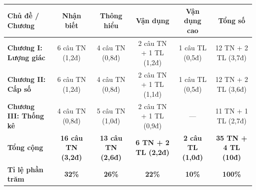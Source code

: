 \documentclass[12pt, a4paper]{article}
\begin{document}
\begin{center}
\begin{tabularx}{\linewidth}{|p{3.2cm}|c|c|c|c|c|}
\hline
\textbf{Chủ đề / Chương} & \textbf{Nhận biết} & \textbf{Thông hiểu} & \textbf{Vận dụng} & \textbf{Vận dụng cao} & \textbf{Tổng số} \\
\hline
\textbf{Chương I: Lượng giác} & 6 câu TN (1,2đ) & 4 câu TN (0,8đ) & 2 câu TN + 1 TL (1,2đ) & 1 câu TL (0,5đ) & 12 TN + 2 TL (3,7đ) \\
\hline
\textbf{Chương II: Cấp số} & 6 câu TN (1,2đ) & 4 câu TN (0,8đ) & 2 câu TN + 1 TL (1,1đ) & 1 câu TL (0,5đ) & 12 TN + 2 TL (3,6đ) \\
\hline
\textbf{Chương III: Thống kê} & 4 câu TN (0,8đ) & 5 câu TN (1,0đ) & 2 câu TN + 1 TL (0,9đ) & --- & 11 TN + 1 TL (2,7đ) \\
\hline
\textbf{Tổng cộng} & \textbf{16 câu TN (3,2đ)} & \textbf{13 câu TN (2,6đ)} & \textbf{6 TN + 2 TL (2,2đ)} & \textbf{2 câu TL (1,0đ)} & \textbf{35 TN + 4 TL (10đ)} \\
\hline
\textbf{Tỉ lệ phần trăm} & \textbf{32\%} & \textbf{26\%} & \textbf{22\%} & \textbf{10\%} & \textbf{100\%} \\
\hline
\end{tabularx}
\end{center}
\end{document}
